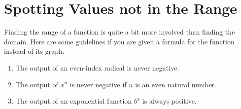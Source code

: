 \documentclass[nooutcomes]{ximera}
\begin{document}
\section{Spotting Values not in the Range}
	Finding the range of a function is quite a bit more involved than finding the domain. Here are some guidelines if you are given a formula for the function instead of its graph.
	\begin{callout}
		\begin{enumerate}
			\item The output of an even-index radical is never negative.
			\item The output of $x^n$ is never negative if $n$ is an even natural number.
			\item The output of an exponential function $b^x$ is always positive.
		\end{enumerate}
	\end{callout}
	
\end{document}
